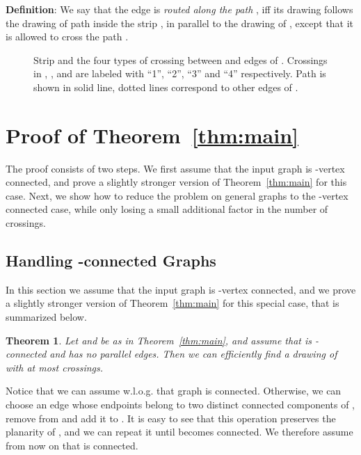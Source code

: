 \documentclass[twoside,leqno,twocolumn]{article}
\newtheorem{theorem}{Theorem}
\newenvironment{Definition}{{\bf Definition}: }{}
\begin{document}
\begin{Definition}
We say that the edge  is \emph{routed along the path }, 
iff its drawing follows the drawing of path  inside the strip , in parallel to the drawing of , 
except that it is allowed to cross the path . 
\end{Definition}


\begin{figure}
\begin{center}
\caption{Strip  and the four types of crossing between  and edges of . Crossings in , ,  and  are labeled with ``1'', ``2'', ``3'' and ``4'' respectively. Path  is shown in solid line, dotted lines correspond to other edges of .}
\label{crossings-c1-c2-c3}
\end{center}
\end{figure}




\section{Proof of Theorem~\ref{thm:main}}\label{sec:alg}
The proof consists of two steps. We first assume that the input graph  is -vertex connected, and prove a slightly stronger version of Theorem~\ref{thm:main} for this case. Next, we show how to reduce the problem on general graphs to the -vertex connected case, while only losing a small additional factor in the number of crossings.

\subsection{Handling -connected Graphs}
In this section we assume that the input graph  is -vertex connected, and we prove a slightly stronger version of Theorem~\ref{thm:main} for this special case, that is summarized below. 

\begin{theorem}\label{thm:main2}
Let  and  be as in Theorem~\ref{thm:main}, and assume that  is -connected and has no parallel edges.
 Then we can efficiently find a drawing of  with at most  crossings.
\end{theorem}



Notice that we can assume w.l.o.g. that graph  is connected. Otherwise, we can choose an edge  whose endpoints belong to two distinct connected components of , remove  from  and add it to . It is easy to see that this operation preserves the planarity of , and we can repeat it until  becomes connected. We therefore assume from now on that  is connected.
\end{document}
